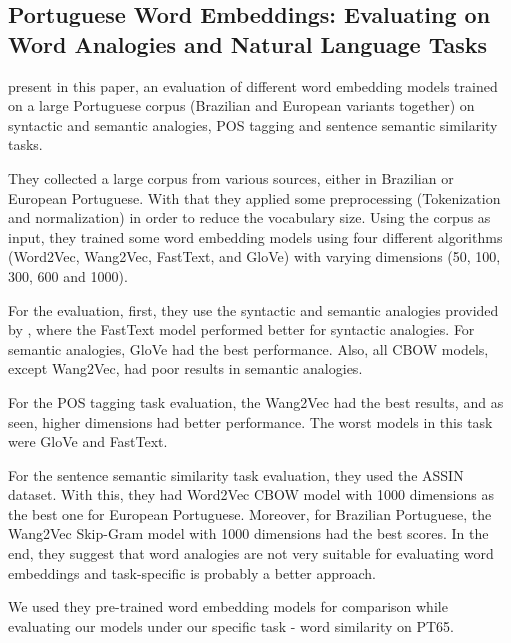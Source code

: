 \subsection{Portuguese Word Embeddings: Evaluating on Word Analogies and Natural
Language Tasks}

 present in this paper, an evaluation of different word embedding models trained on a large Portuguese corpus (Brazilian and European variants together) on syntactic and semantic analogies, POS tagging and sentence semantic similarity tasks.

They collected a large corpus from various sources, either in Brazilian or European Portuguese. With that they applied some preprocessing (Tokenization and normalization) in order to reduce the vocabulary size. Using the corpus as input, they trained some word embedding models using four different algorithms (Word2Vec, Wang2Vec, FastText, and GloVe) with varying dimensions (50, 100, 300, 600 and 1000).

For the evaluation, first, they use the syntactic and semantic analogies provided by , where the FastText model performed better for syntactic analogies. For semantic analogies, GloVe had the best performance. Also, all CBOW models, except Wang2Vec, had poor results in semantic analogies.

For the POS tagging task evaluation, the Wang2Vec had the best results, and as seen, higher dimensions had better performance. The worst models in this task were GloVe and FastText. 

For the sentence semantic similarity task evaluation, they used the ASSIN dataset. With this, they had Word2Vec CBOW model with 1000 dimensions as the best one for European Portuguese. Moreover, for Brazilian Portuguese, the Wang2Vec Skip-Gram model with 1000 dimensions had the best scores.
In the end, they suggest that word analogies are not very suitable for evaluating word embeddings and task-specific is probably a better approach.

We used they pre-trained word embedding models for comparison while evaluating our models under our specific task - word similarity on PT65.






